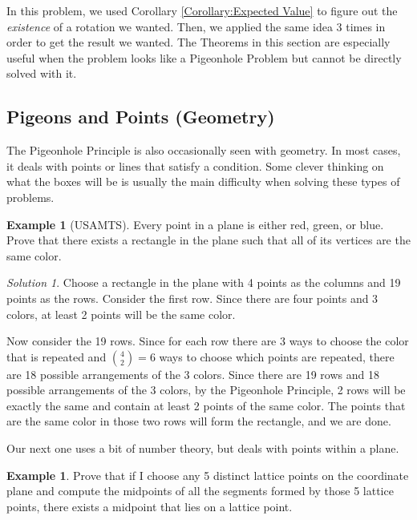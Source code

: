 \documentclass[l1pt]{article}
\theoremstyle{plain}
\theoremstyle{definition}
\newtheorem{example}[thm]{Example}
\theoremstyle{remark}
\newtheorem*{solution}{Solution}
\begin{document}
In this problem, we used Corollary \ref{Corollary:Expected Value} to figure out the \emph{existence} of a rotation we wanted. Then, we applied the same idea 3 times in order to get the result we wanted. The Theorems in this section are especially useful when the problem looks like a Pigeonhole Problem but cannot be directly solved with it.

\subsection{Pigeons and Points (Geometry)}

The Pigeonhole Principle is also occasionally seen with geometry. In most cases, it deals with points or lines that satisfy a condition. Some clever thinking on what the boxes will be is usually the main difficulty when solving these types of problems.

\begin{example}[USAMTS]
Every point in a plane is either red, green, or blue. Prove that there exists a rectangle in the plane such that all of its vertices are the same color.
\end{example}

\begin{solution}
Choose a rectangle in the plane with 4 points as the columns and 19 points as the rows. Consider the first row. Since there are four points and 3 colors, at least 2 points will be the same color. 

Now consider the 19 rows. Since for each row there are 3 ways to choose the color that is repeated and $\binom{4}{2}=6$ ways to choose which points are repeated, there are 18 possible arrangements of the 3 colors. Since there are 19 rows and 18 possible arrangements of the 3 colors, by the Pigeonhole Principle, 2 rows will be exactly the same and contain at least 2 points of the same color. The points that are the same color in those two rows will form the rectangle, and we are done.
\end{solution}

Our next one uses a bit of number theory, but deals with points within a plane.

\begin{example}
Prove that if I choose any 5 distinct lattice points on the coordinate plane and compute the midpoints of all the segments formed by those 5 lattice points, there exists a midpoint that lies on a lattice point.
\end{example}
\end{document}
